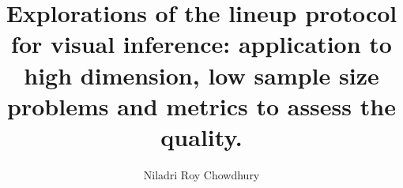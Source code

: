 \title{Explorations of the lineup protocol for visual inference: application to high dimension, low sample size problems and metrics to assess the quality.}
\author{Niladri Roy Chowdhury}
\notice
\maketitle
